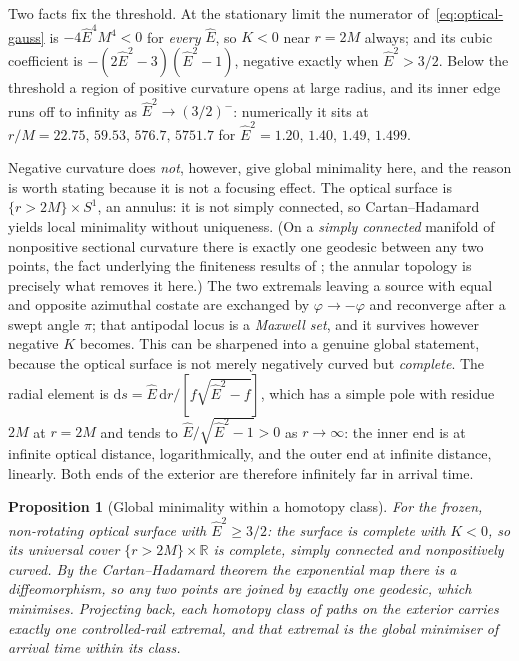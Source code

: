 \documentclass[12pt]{iopart}
\theoremstyle{plain}
\newtheorem{proposition}{Proposition}
\theoremstyle{definition}
\theoremstyle{remark}
\newcommand{\Ehat}{\hat E}
\newcommand{\dd}{\mathrm{d}}
\begin{document}
Two facts fix the threshold. At the stationary limit the numerator
of~\eqref{eq:optical-gauss} is $-4\Ehat^4M^4<0$ for \emph{every} $\Ehat$, so $K<0$
near $r=2M$ always; and its cubic coefficient is
$-(2\Ehat^2-3)(\Ehat^2-1)$, negative exactly when $\Ehat^2>3/2$. Below the
threshold a region of positive curvature opens at large radius, and its inner
edge runs off to infinity as $\Ehat^2\to(3/2)^-$: numerically it sits at
$r/M=22.75,\,59.53,\,576.7,\,5751.7$ for $\Ehat^2=1.20,\,1.40,\,1.49,\,1.499$.

Negative curvature does \emph{not}, however, give global minimality here, and the
reason is worth stating because it is not a focusing effect. The optical surface
is $\{r>2M\}\times S^1$, an annulus: it is not simply connected, so
Cartan--Hadamard yields local minimality without uniqueness. (On a \emph{simply
connected} manifold of nonpositive sectional curvature there is exactly one
geodesic between any two points, the fact underlying the finiteness results of
\cite{GiannoniMasielloPiccione2001}; the annular topology is precisely what
removes it here.) The two extremals
leaving a source with equal and opposite azimuthal costate are exchanged by
$\varphi\to-\varphi$ and reconverge after a swept angle $\pi$; that antipodal
locus is a \emph{Maxwell set}, and it survives however negative $K$ becomes.
This can be sharpened into a genuine global statement, because the optical surface
is not merely negatively curved but \emph{complete}. The radial element is
$\dd s=\Ehat\,\dd r/[f\sqrt{\Ehat^2-f}]$, which has a simple pole with residue
$2M$ at $r=2M$ and tends to $\Ehat/\sqrt{\Ehat^2-1}>0$ as $r\to\infty$: the inner
end is at infinite optical distance, logarithmically, and the outer end at
infinite distance, linearly. Both ends of the exterior are therefore infinitely
far in arrival time.

\begin{proposition}[Global minimality within a homotopy class]
\label{prop:globalmin}
For the frozen, non-rotating optical surface with $\Ehat^2\ge3/2$: the surface is
complete with $K<0$, so its universal cover $\{r>2M\}\times\mathbb R$ is complete,
simply connected and nonpositively curved. By the Cartan--Hadamard theorem the
exponential map there is a diffeomorphism, so any two points are joined by
exactly one geodesic, which minimises. Projecting back, each homotopy class of
paths on the exterior carries \emph{exactly one} controlled-rail extremal, and
that extremal is the \emph{global} minimiser of arrival time within its class.
\end{proposition}
\end{document}
